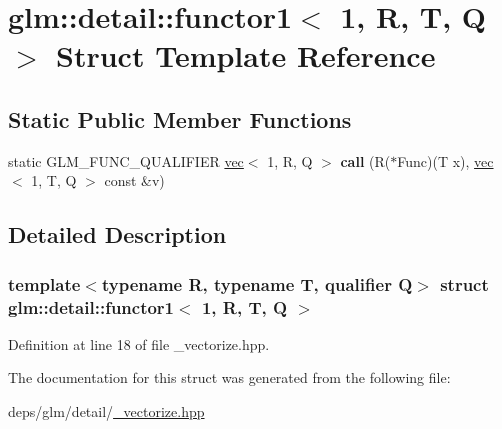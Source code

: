 \hypertarget{structglm_1_1detail_1_1functor1_3_011_00_01R_00_01T_00_01Q_01_4}{}\section{glm\+:\+:detail\+:\+:functor1$<$ 1, R, T, Q $>$ Struct Template Reference}
\label{structglm_1_1detail_1_1functor1_3_011_00_01R_00_01T_00_01Q_01_4}
\subsection*{Static Public Member Functions}
\begin{DoxyCompactItemize}
\item 
\mbox{\label{structglm_1_1detail_1_1functor1_3_011_00_01R_00_01T_00_01Q_01_4_ab729a87fa4a02c97b5cfaadd1000488c}} 
static G\+L\+M\+\_\+\+F\+U\+N\+C\+\_\+\+Q\+U\+A\+L\+I\+F\+I\+ER \hyperlink{structglm_1_1vec}{vec}$<$ 1, R, Q $>$ {\bfseries call} (R($\ast$Func)(T x), \hyperlink{structglm_1_1vec}{vec}$<$ 1, T, Q $>$ const \&v)
\end{DoxyCompactItemize}


\subsection{Detailed Description}
\subsubsection*{template$<$typename R, typename T, qualifier Q$>$\newline
struct glm\+::detail\+::functor1$<$ 1, R, T, Q $>$}



Definition at line 18 of file \+\_\+vectorize.\+hpp.



The documentation for this struct was generated from the following file\+:\begin{DoxyCompactItemize}
\item 
deps/glm/detail/\hyperlink{__vectorize_8hpp}{\+\_\+vectorize.\+hpp}\end{DoxyCompactItemize}
